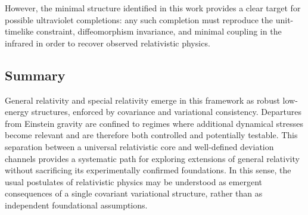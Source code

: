 \documentclass[11pt]{article}
\begin{document}
            However, the minimal structure identified in this work provides a clear target
            for possible ultraviolet completions: any such completion must reproduce the
            unit-timelike constraint, diffeomorphism invariance, and minimal coupling in the
            infrared in order to recover observed relativistic physics.

        \subsection{Summary}
            General relativity and special relativity emerge in this framework as robust
            low-energy structures, enforced by covariance and variational consistency.
            Departures from Einstein gravity are confined to regimes where additional
            dynamical stresses become relevant and are therefore both controlled and
            potentially testable.
            This separation between a universal relativistic core and well-defined
            deviation channels provides a systematic path for exploring extensions of
            general relativity without sacrificing its experimentally confirmed foundations.
            In this sense, the usual postulates of relativistic physics may be understood as
            emergent consequences of a single covariant variational structure, rather than
            as independent foundational assumptions.
\end{document}
